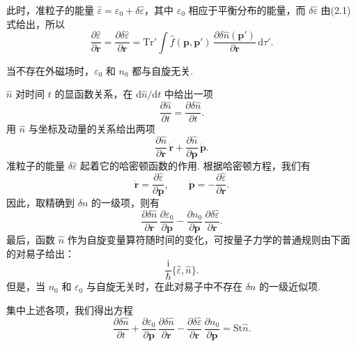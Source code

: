 此时，准粒子的能量 $\hat\varepsilon=\varepsilon_{0}+\delta\hat\varepsilon$，其中 $\varepsilon_{0}$ 相应于平衡分布的能量，而 $\delta\hat\varepsilon$ 由(2.1)式给出，所以
\begin{equation}
\frac{\partial\hat\varepsilon}{\partial\bm r}=\frac{\partial\delta\hat\varepsilon}{\partial\bm r}
=\mathrm{Tr}'\int\hat f(\bm p,\bm p')\,\frac{\partial\delta\hat n(\bm p')}{\partial\bm r}\,\mathrm{d}\tau'.
\end{equation}

当不存在外磁场时，$\varepsilon_{0}$ 和 $n_{0}$ 都与自旋无关.

$\hat n$ 对时间 $t$ 的显函数关系，在 $\mathrm{d}\hat n/\mathrm{d}t$ 中给出一项
\begin{equation*}
\frac{\partial\hat n}{\partial t}=\frac{\partial\delta\hat n}{\partial t}.
\end{equation*}
用 $\hat n$ 与坐标及动量的关系给出两项
\begin{equation*}
\frac{\partial\hat n}{\partial\bm r}\,\dot{\bm r}+\frac{\partial\hat n}{\partial\bm p}\,\dot{\bm p}.
\end{equation*}
准粒子的能量 $\delta\hat\varepsilon$ 起着它的哈密顿函数的作用. 根据哈密顿方程，我们有
\begin{equation*}
\dot{\bm r}=\frac{\partial\hat\varepsilon}{\partial\bm p},\qquad
\dot{\bm p}=-\frac{\partial\hat\varepsilon}{\partial\bm r}.
\end{equation*}
因此，取精确到 $\delta n$ 的一级项，则有
\begin{equation*}
\frac{\partial\delta\hat n}{\partial\bm r}\,\frac{\partial\varepsilon_{0}}{\partial\bm p}
-\frac{\partial n_{0}}{\partial\bm p}\,\frac{\partial\delta\hat\varepsilon}{\partial\bm r}.
\end{equation*}
最后，函数 $\hat n$ 作为自旋变量算符随时间的变化，可按量子力学的普通规则由下面的对易子给出：
\begin{equation}
\frac{\mathrm{i}}{\hbar}\{\hat\varepsilon,\hat n\}.
\end{equation}
但是，当 $n_{0}$ 和 $\varepsilon_{0}$ 与自旋无关时，在此对易子中不存在 $\delta n$ 的一级近似项.

集中上述各项，我们得出方程
\begin{equation}
\frac{\partial\delta\hat n}{\partial t}
+\frac{\partial\varepsilon_{0}}{\partial\bm p}\,\frac{\partial\delta\hat n}{\partial\bm r}
-\frac{\partial\delta\hat\varepsilon}{\partial\bm r}\,\frac{\partial n_{0}}{\partial\bm p}
=\mathrm{St}\hat n.
\end{equation}

